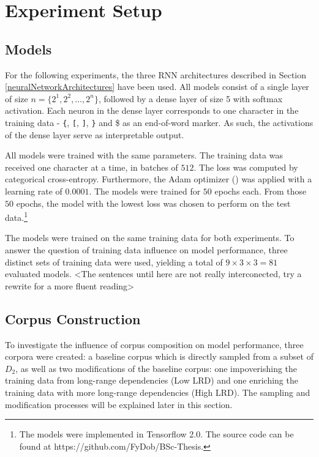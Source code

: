 \section{Experiment Setup}\label{experimentSetup}

\subsection{Models}\label{models}
For the following experiments, the three RNN architectures described in Section \ref{neuralNetworkArchitectures} have been used. All models consist of a single layer of size $n = \lbrace 2^{1}, 2^{2}, \dots, 2^{n} \rbrace$, followed by a dense layer of size 5 with softmax activation. Each neuron in the dense layer corresponds to one character in the training data - \texttt{\{}, \texttt{[}, \texttt{]}, \texttt{\}} and \$<kind of a nitpick, but i would put this in an in-line quation> as an end-of-word marker. As such, the activations of the dense layer serve as interpretable output.

All models were trained with the same parameters. The training data was received one character at a time, in batches of $512$. The loss was computed by categorical cross-entropy. Furthermore, the Adam optimizer (\cite{Kingma2014}) was applied with a learning rate of $0.0001$. The models were trained for $50$ epochs each. From those $50$ epochs, the model with the lowest loss was chosen to perform on the test data.\footnote{The models were implemented in Tensorflow 2.0. The source code can be found at https://github.com/FyDob/BSc-Thesis.}

The models were trained on the same training data for both experiments. To answer the question of training data influence on model performance, three distinct sets of training data were used, yielding a total of $9 \times 3 \times 3 = 81$ evaluated models. <The sentences until here are not really interconected, try a rewrite for a more fluent reading>

\subsection{Corpus Construction}\label{corpusConstruction}
To investigate the influence of corpus composition on model performance, three corpora were created: a baseline corpus which is directly sampled from a subset of $D_{2}$, as well as two modifications of the baseline corpus: one impoverishing the training data from long-range dependencies (Low LRD) and one enriching the training data with more long-range dependencies (High LRD). The sampling and modification processes will be explained later in this section.

